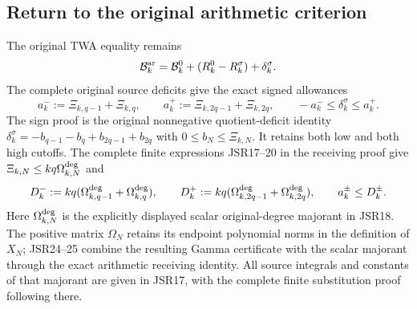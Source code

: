 \documentclass[11pt,a4paper]{article}
\begin{document}
\subsection{Return to the original arithmetic criterion}
The original TWA equality remains
\begin{equation}
 \mathcal B_k^{\rm ar}=\mathcal B_k^0+(R_k^0-R_k^\sigma)+\delta_k^\sigma.
\end{equation}
The complete original source deficits give the exact signed allowances
\begin{equation}
 a_k^-:=\Xi_{k,q-1}+\Xi_{k,q},\qquad
 a_k^+:=\Xi_{k,2q-1}+\Xi_{k,2q},\qquad
 -a_k^-\le\delta_k^\sigma\le a_k^+.
\end{equation}
The sign proof is the original nonnegative quotient-deficit identity
$\delta_k^\sigma=-b_{q-1}-b_q+b_{2q-1}+b_{2q}$ with
$0\le b_N\le\Xi_{k,N}$. It retains both low and both high cutoffs.
The complete finite expressions JSR17--20 in the receiving proof give
$\Xi_{k,N}\le kq\Omega_{k,N}^{\rm deg}$ and
\begin{equation}
 D_k^-:=kq(\Omega_{k,q-1}^{\rm deg}+\Omega_{k,q}^{\rm deg}),\qquad
 D_k^+:=kq(\Omega_{k,2q-1}^{\rm deg}+\Omega_{k,2q}^{\rm deg}),\qquad
 a_k^\pm\le D_k^\pm.
\end{equation}
Here $\Omega_{k,N}^{\rm deg}$ is the explicitly displayed scalar
original-degree majorant in JSR18. The positive matrix $\Omega_N$
retains its endpoint polynomial norms in the definition of $X_N$;
JSR24--25 combine the resulting Gamma certificate with the scalar
majorant through the exact arithmetic receiving identity. All source
integrals and constants of that majorant are given in JSR17, with
the complete finite substitution proof following there.
\end{document}
